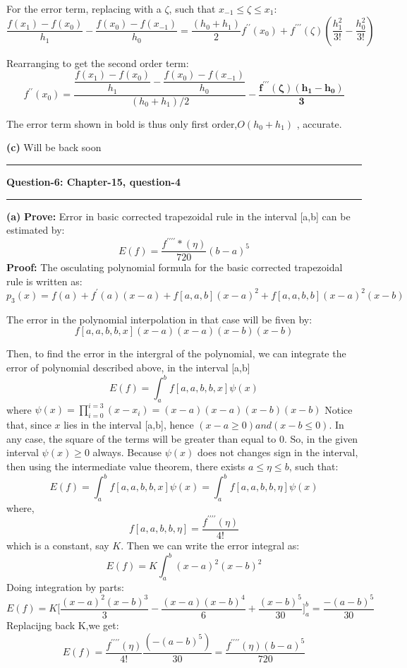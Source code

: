 \documentclass{article}
\newcommand\question[2]{\vspace{.25in}\hrule\textbf{#1: #2}\hrule\vspace{.10in}}
\renewcommand\part[1]{\vspace{.10in}\textbf{(#1)}}
\begin{document}
  For the error term, replacing with a $\zeta$, such that $x_{-1} \leq \zeta \leq x_1$:
  \[\dfrac{f(x_1) - f(x_0)}{h_1} - \dfrac{f(x_{0}) - f(x_{-1})}{h_0} = \dfrac{(h_0 + h_1)}{2}f^{\prime\prime}(x_0) + f^{\prime\prime\prime}(\zeta)(\dfrac{h_1^2}{3!} - \dfrac{h_0^2}{3!})\]

  Rearranging to get the second order term:
  \[f^{\prime\prime}(x_0) = \dfrac{\dfrac{f(x_1) - f(x_0)}{h_1} - \dfrac{f(x_{0}) - f(x_{-1})}{h_0}}{(h_0 + h_1)/2} - \mathbf{\dfrac{f^{\prime\prime\prime}(\zeta)(h_1 - h_0)}{3}}\]

  The error term shown in bold is thus only first order,$O(h_0 + h_1)$ , accurate.

  \part{c} Will be back soon



  

  \question{Question-6}{Chapter-15, question-4}
  \part{a} \textbf {Prove:} Error in basic corrected trapezoidal rule in the interval [a,b] can be estimated by:
  \[E(f) = \dfrac{f^{\prime\prime\prime\prime}*(\eta)}{720} (b-a)^5\]
  \textbf {Proof:} The osculating polynomial formula for the basic corrected trapezoidal rule is written as:
  \[p_3(x) = f(a) + f^\prime(a)(x-a) + f[a,a,b](x-a)^2 + f[a,a,b,b](x-a)^2(x-b)\]

  The error in the polynomial interpolation in that case will be fiven by:
  \[f[a,a,b,b,x](x-a)(x-a)(x-b)(x-b)\]

  Then, to find the error in the intergral of the polynomial, we can integrate the error of polynomial described above, in the interval [a,b]
  \[E(f) = \int_{a}^{b} f[a,a,b,b,x]\psi(x)\]
  where $\psi(x) = \prod_{i=0}^{i=3}(x - x_i) = (x-a)(x-a)(x-b)(x-b)$ \newline
  Notice that, since $x$ lies in the interval [a,b], hence $(x-a \geq 0) and (x-b \leq 0)$. In any case, the square of the terms will be greater than equal to 0. So, in the given interval $\psi(x) \geq 0$ always. Because $\psi(x)$ does not changes sign in the interval, then using the intermediate value theorem, there exists $a \leq \eta \leq b$, such that:
  \[E(f) = \int_{a}^{b} f[a,a,b,b,x]\psi(x) = \int_{a}^{b} f[a,a,b,b,\eta]\psi(x)\]
  where,
  \[f[a,a,b,b,\eta] = \dfrac{f^{\prime\prime\prime\prime}(\eta)}{4!}\]
  which is a constant, say $K$. \newline
  Then we can write the error integral as:
  \[E(f) = K \int_{a}^{b} (x-a)^2(x-b)^2 \]
  Doing integration by parts:
  \[E(f) = K\bigg [ \dfrac{(x-a)^2(x-b)^3}{3} - \dfrac{(x-a)(x-b)^4}{6} + \dfrac{(x - b)^5}{30}    \bigg ]_{a}^{b} = \dfrac{-(a-b)^5}{30}\]
  Replacijng back K,we get:
  \[E(f) = \dfrac{f^{\prime\prime\prime\prime}(\eta)}{4!}\dfrac{(-(a-b)^5)}{30} = \dfrac{f^{\prime\prime\prime\prime}(\eta)(b-a)^5}{720} \]
\end{document}
